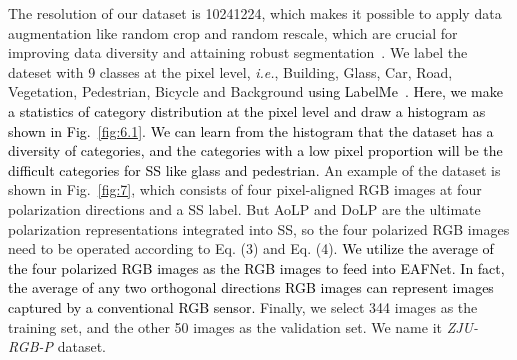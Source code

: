 \documentclass{osa-article}
\newcommand{\YKL}[1]{\textcolor{black}{#1}}
\begin{document}
The resolution of our dataset is 10241224, which makes it possible to apply data augmentation like random crop and random rescale, which are crucial for improving data diversity and attaining robust segmentation~\cite{yang2019robustifying}.
We label the dateset with 9 classes at the pixel level, \textit{i.e.}, Building, Glass, Car, Road, Vegetation, Pedestrian, Bicycle and Background \YKL{using LabelMe~\cite{russell2008labelme}. Here, we make a statistics of category distribution at the pixel level and draw a histogram as shown in Fig.~\ref{fig:6.1}. We can learn from the histogram that the dataset has a diversity of categories, and the categories with a low pixel proportion will be the difficult categories for SS like glass and pedestrian.}  
An example of the dataset is shown in Fig.~\ref{fig:7}, which consists of four pixel-aligned RGB images at four polarization directions and a SS label.
But AoLP and DoLP are the ultimate polarization representations integrated into SS, so the four polarized RGB images need to be operated according to  Eq. (3) and  Eq. (4).
\YKL{We utilize the average of the four polarized RGB images as the RGB images to feed into EAFNet. In fact, the average of any two orthogonal directions RGB images can represent images captured by a conventional RGB sensor.} 
Finally, we select 344 images as the training set, and the other 50 images as the validation set. We name it \textit{ZJU-RGB-P} dataset.
\end{document}
